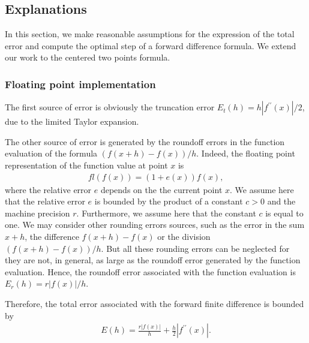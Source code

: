 \subsection{Explanations}

In this section, we make reasonable assumptions for the 
expression of the total error and compute the optimal step of a forward
difference formula. We extend our work to the centered two 
points formula.

\subsubsection{Floating point implementation}

The first source of error is obviously the truncation error 
$E_t(h) = h |f^{\prime \prime}(x)|/2$, due to the limited Taylor expansion.

The other source of error is generated by the roundoff errors in the function 
evaluation of the formula $(f(x+h) - f(x))/h$. 
Indeed, the floating point representation of the function value at point $x$ is 
\begin{eqnarray}
fl(f(x)) = (1+e(x))f(x),
\end{eqnarray}
where the relative error $e$ depends on the the current point $x$.
We assume here that the relative error $e$ is bounded by the product of a constant $c>0$
and the machine precision $r$. Furthermore, we assume here that the constant 
$c$ is equal to one.
We may consider other rounding errors sources, such as the error in the 
sum $x+h$, the difference $f(x+h)-f(x)$ or the division $(f(x+h)-f(x))/h$.
But all these rounding errors can be neglected for they are 
not, in general, as large as the roundoff error generated by the function 
evaluation.
Hence, the roundoff error associated with the function evaluation is $E_r(h)=r|f(x)|/h$.

Therefore, the total error associated with the forward finite difference is bounded by 
\begin{eqnarray}
\label{eq-scilabnaive-totalerror}
E(h) = \frac{r|f(x)|}{h} + \frac{h}{2} |f^{\prime \prime}(x)|.
\end{eqnarray}

